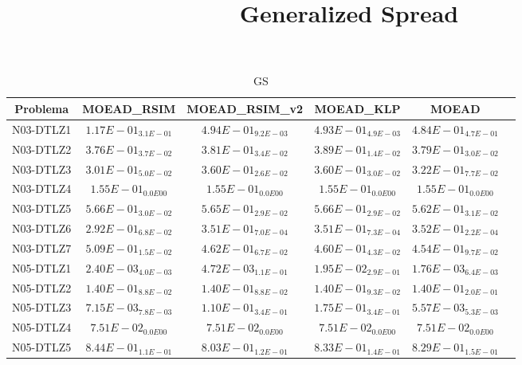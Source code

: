 \documentclass{article}
\title{Generalized Spread}
\author{}
\begin{document}
\maketitle
\begin{table*}[ht!]
\scriptsize
\caption{GS}
\centering\begin{tabular}{|c||c||c||c||c||c|} \hline
Problema &MOEAD_RSIM &MOEAD_RSIM_v2 &MOEAD_KLP &MOEAD\\\hline
N03-DTLZ1 &\cellcolor{gray95}$1.17E-01_{3.1E-01}$ &$4.94E-01_{9.2E-03}$ &$4.93E-01_{4.9E-03}$ &\cellcolor{gray25}$4.84E-01_{4.7E-01}$\\ 
\hline
N03-DTLZ2 &\cellcolor{gray95}$3.76E-01_{3.7E-02}$ &$3.81E-01_{3.4E-02}$ &$3.89E-01_{1.4E-02}$ &\cellcolor{gray25}$3.79E-01_{3.0E-02}$\\ 
\hline
N03-DTLZ3 &\cellcolor{gray95}$3.01E-01_{5.0E-02}$ &$3.60E-01_{2.6E-02}$ &$3.60E-01_{3.0E-02}$ &\cellcolor{gray25}$3.22E-01_{7.7E-02}$\\ 
\hline
N03-DTLZ4 &\cellcolor{gray95}$1.55E-01_{0.0E00}$ &\cellcolor{gray25}$1.55E-01_{0.0E00}$ &$1.55E-01_{0.0E00}$ &$1.55E-01_{0.0E00}$\\ 
\hline
N03-DTLZ5 &$5.66E-01_{3.0E-02}$ &\cellcolor{gray25}$5.65E-01_{2.9E-02}$ &$5.66E-01_{2.9E-02}$ &\cellcolor{gray95}$5.62E-01_{3.1E-02}$\\ 
\hline
N03-DTLZ6 &\cellcolor{gray95}$2.92E-01_{6.8E-02}$ &$3.51E-01_{7.0E-04}$ &\cellcolor{gray25}$3.51E-01_{7.3E-04}$ &$3.52E-01_{2.2E-04}$\\ 
\hline
N03-DTLZ7 &$5.09E-01_{1.5E-02}$ &$4.62E-01_{6.7E-02}$ &\cellcolor{gray25}$4.60E-01_{4.3E-02}$ &\cellcolor{gray95}$4.54E-01_{9.7E-02}$\\ 
\hline
N05-DTLZ1 &\cellcolor{gray25}$2.40E-03_{4.0E-03}$ &$4.72E-03_{1.1E-01}$ &$1.95E-02_{2.9E-01}$ &\cellcolor{gray95}$1.76E-03_{6.4E-03}$\\ 
\hline
N05-DTLZ2 &\cellcolor{gray95}$1.40E-01_{8.8E-02}$ &$1.40E-01_{8.8E-02}$ &\cellcolor{gray25}$1.40E-01_{9.3E-02}$ &$1.40E-01_{2.0E-01}$\\ 
\hline
N05-DTLZ3 &\cellcolor{gray25}$7.15E-03_{7.8E-03}$ &$1.10E-01_{3.4E-01}$ &$1.75E-01_{3.4E-01}$ &\cellcolor{gray95}$5.57E-03_{5.3E-03}$\\ 
\hline
N05-DTLZ4 &\cellcolor{gray95}$7.51E-02_{0.0E00}$ &\cellcolor{gray25}$7.51E-02_{0.0E00}$ &$7.51E-02_{0.0E00}$ &$7.51E-02_{0.0E00}$\\ 
\hline
N05-DTLZ5 &$8.44E-01_{1.1E-01}$ &\cellcolor{gray95}$8.03E-01_{1.2E-01}$ &$8.33E-01_{1.4E-01}$ &\cellcolor{gray25}$8.29E-01_{1.5E-01}$\\ 

\end{tabular}
\end{table*}
\end{document}
